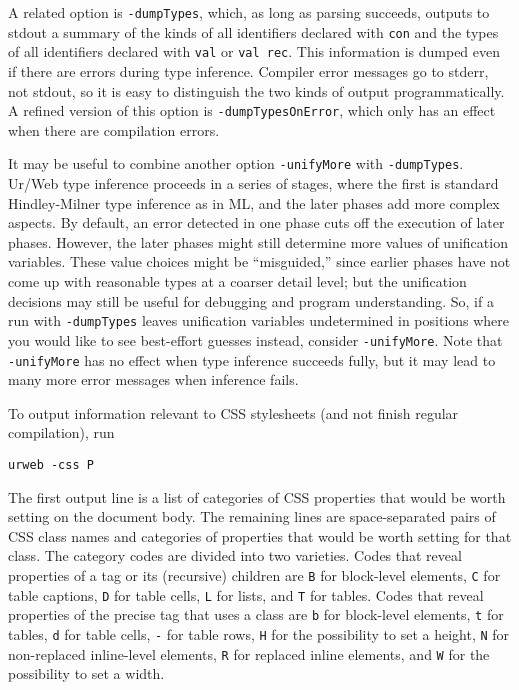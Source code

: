 \documentclass{article}
\newcommand{\cd}[1]{\texttt{#1}}
\begin{document}
A related option is \cd{-dumpTypes}, which, as long as parsing succeeds, outputs to stdout a summary of the kinds of all identifiers declared with \cd{con} and the types of all identifiers declared with \cd{val} or \cd{val rec}.  This information is dumped even if there are errors during type inference.  Compiler error messages go to stderr, not stdout, so it is easy to distinguish the two kinds of output programmatically.  A refined version of this option is \cd{-dumpTypesOnError}, which only has an effect when there are compilation errors.

It may be useful to combine another option \cd{-unifyMore} with \cd{-dumpTypes}.  Ur/Web type inference proceeds in a series of stages, where the first is standard Hindley-Milner type inference as in ML, and the later phases add more complex aspects.  By default, an error detected in one phase cuts off the execution of later phases.  However, the later phases might still determine more values of unification variables.  These value choices might be ``misguided,'' since earlier phases have not come up with reasonable types at a coarser detail level; but the unification decisions may still be useful for debugging and program understanding.  So, if a run with \cd{-dumpTypes} leaves unification variables undetermined in positions where you would like to see best-effort guesses instead, consider \cd{-unifyMore}.  Note that \cd{-unifyMore} has no effect when type inference succeeds fully, but it may lead to many more error messages when inference fails.

To output information relevant to CSS stylesheets (and not finish regular compilation), run
\begin{verbatim}
urweb -css P
\end{verbatim}
The first output line is a list of categories of CSS properties that would be worth setting on the document body.  The remaining lines are space-separated pairs of CSS class names and categories of properties that would be worth setting for that class.  The category codes are divided into two varieties.  Codes that reveal properties of a tag or its (recursive) children are \cd{B} for block-level elements, \cd{C} for table captions, \cd{D} for table cells, \cd{L} for lists, and \cd{T} for tables.  Codes that reveal properties of the precise tag that uses a class are \cd{b} for block-level elements, \cd{t} for tables, \cd{d} for table cells, \cd{-} for table rows, \cd{H} for the possibility to set a height, \cd{N} for non-replaced inline-level elements, \cd{R} for replaced inline elements, and \cd{W} for the possibility to set a width.
\end{document}
